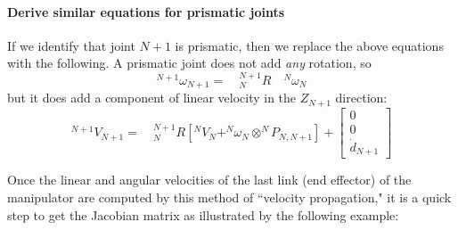 \begin{ExampleSmall}
\paragraph{Derive similar equations for prismatic joints}

If we identify that joint $N+1$ is prismatic, then we replace the
above equations with the following.
A prismatic joint does not add {\it any} rotation, so
\[
^{N+1}\omega_{N+1} = \quad {^{N+1}_{N}R}\quad {^{N}\omega_{N}}
\]
but it does add a component of linear velocity in the $Z_{N+1}$ direction:
\[
^{N+1}V_{N+1} =\quad  {^{N+1}_{N}R}\left[
   ^{N}V_{N} +
   ^{N}\omega_{N} \otimes ^NP_{N,N+1}
   \right] +
\left[
\begin{array}{c}
0 \\
0 \\
\dot{d}_{N+1}
\end{array}
\right]
\]
\end{ExampleSmall}

Once the linear and angular velocities of the last link (end effector) of the manipulator are computed by this method of ``velocity propagation," it is a quick step to get the Jacobian matrix as illustrated by the following example:



